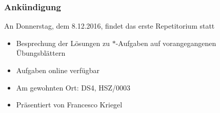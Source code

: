 \documentclass[onlymath]{beamer}
\begin{document}
\maketitle

\begin{frame}\frametitle{Ankündigung}

\begin{center}
\alert{An Donnerstag, dem 8.12.2016, findet das erste Repetitorium statt}

\begin{itemize}
\item Besprechung der Lösungen zu $*$-Aufgaben auf vorangegangenen Übungsblättern
\item Aufgaben online verfügbar
\item Am gewohnten Ort: DS4, HSZ/0003
\item Präsentiert von Francesco Kriegel
\end{itemize}

\end{center}

\end{frame}

\end{document}
